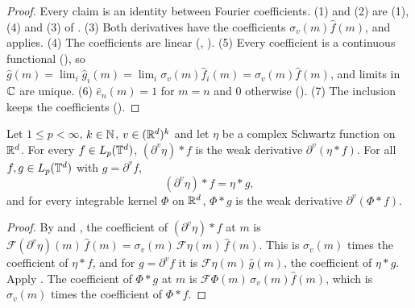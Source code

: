 \begin{proof}
\leanok
Every claim is an identity between Fourier coefficients. (1) and (2) are (1), (4) and (3) of
. (3) Both derivatives have the coefficients $\sigma_v(m) \hat f(m)$,
and  applies. (4) The coefficients are linear
(, ). (5) Every
coefficient is a continuous functional (), so
$\hat g(m) = \lim_i \hat g_i(m) = \lim_i \sigma_v(m) \hat f_i(m) = \sigma_v(m) \hat f(m)$, and
limits in $\mathbb{C}$ are unique. (6) $\hat e_n(m) = 1$ for $m = n$ and $0$ otherwise
(). (7) The inclusion keeps the coefficients
().
\end{proof}

\begin{lemma}
\label{lem:torus-weak-derivative-convolution}
\leanok
{}
Let $1 \leq p < \infty$, $k \in \mathbb{N}$, $v \in (\mathbb{R}^d)^k$ and let $\eta$ be a complex Schwartz
function on $\mathbb{R}^d$. For every $f \in L_p(\mathbb{T}^d)$, $(\partial^v \eta) * f$ is the weak derivative
$\partial^v (\eta * f)$. For all $f, g \in L_p(\mathbb{T}^d)$ with $g = \partial^v f$,
\[
  (\partial^v \eta) * f = \eta * g ,
\]
and for every integrable kernel $\Phi$ on $\mathbb{R}^d$, $\Phi * g$ is the weak derivative
$\partial^v (\Phi * f)$.
\end{lemma}

\begin{proof}
\leanok
By  and , the
coefficient of $(\partial^v \eta) * f$ at $m$ is
$\mathcal{F}(\partial^v \eta)(m) \, \hat f(m) = \sigma_v(m) \, \mathcal{F}\eta(m) \, \hat f(m)$.
This is $\sigma_v(m)$ times the coefficient of $\eta * f$, and for $g = \partial^v f$ it is
$\mathcal{F}\eta(m) \, \hat g(m)$, the coefficient of $\eta * g$. Apply
. The coefficient of $\Phi * g$ at $m$ is
$\mathcal{F}\Phi(m) \, \sigma_v(m) \hat f(m)$, which is $\sigma_v(m)$ times the coefficient of
$\Phi * f$.
\end{proof}

